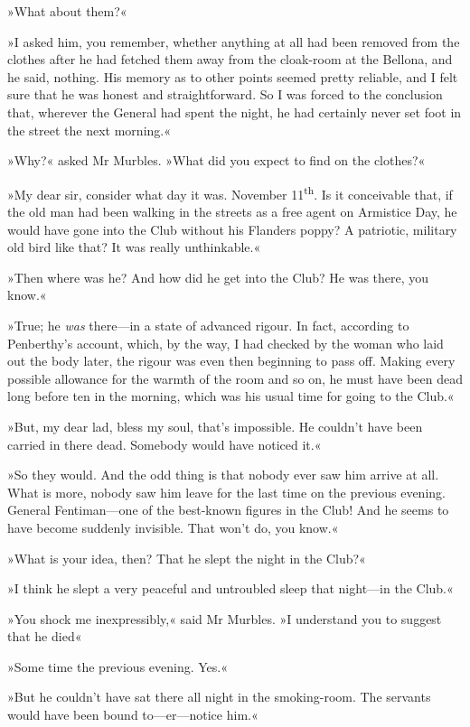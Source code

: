 »What about them?«

»I asked him, you remember, whether anything at all had been removed from the clothes after he had fetched them away from the cloak-room at the Bellona, and he said, nothing. His memory as to other points seemed pretty reliable, and I felt sure that he was honest and straightforward. So I was forced to the conclusion that, wherever the General had spent the night, he had certainly never set foot in the street the next morning.«

»Why?« asked Mr Murbles. »What did you expect to find on the clothes?«

»My dear sir, consider what day it was. November 11\textsuperscript{th}. Is it conceivable that, if the old man had been walking in the streets as a free agent on Armistice Day, he would have gone into the Club without his Flanders poppy? A patriotic, military old bird like that? It was really unthinkable.«

»Then where was he? And how did he get into the Club? He was there, you know.«

»True; he \textit{was} there—in a state of advanced rigour. In fact, according to Penberthy's account, which, by the way, I had checked by the woman who laid out the body later, the rigour was even then beginning to pass off. Making every possible allowance for the warmth of the room and so on, he must have been dead long before ten in the morning, which was his usual time for going to the Club.«

»But, my dear lad, bless my soul, that's impossible. He couldn't have been carried in there dead. Somebody would have noticed it.«

»So they would. And the odd thing is that nobody ever saw him arrive at all. What is more, nobody saw him leave for the last time on the previous evening. General Fentiman—one of the best-known figures in the Club! And he seems to have become suddenly invisible. That won't do, you know.«

»What is your idea, then? That he slept the night in the Club?«

»I think he slept a very peaceful and untroubled sleep that night—in the Club.«

»You shock me inexpressibly,« said Mr Murbles. »I understand you to suggest that he died\longdash«

»Some time the previous evening. Yes.«

»But he couldn't have sat there all night in the smoking-room. The servants would have been bound to—er—notice him.«

